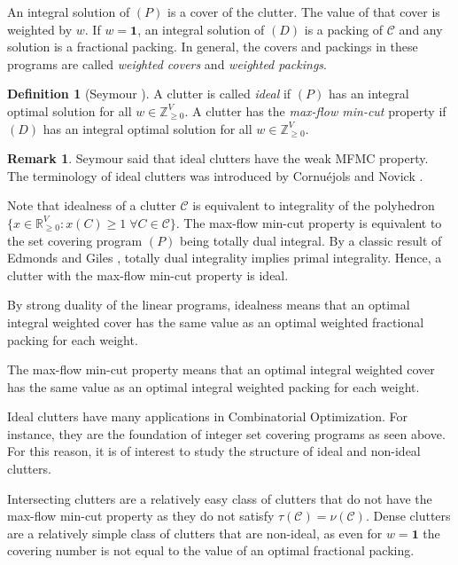 \documentclass[a4paper, 12pt]{scrbook}
\theoremstyle{definition}
\newtheorem*{definition}{Definition}
\newtheorem*{remark}{Remark}
\newcommand*{\IR}{\ensuremath{\mathbb{R}}}
\newcommand*{\IZ}{\ensuremath{\mathbb{Z}}}
\begin{document}
   \vspace{1cm}
   An integral solution of $(P)$ is a cover of the clutter. The value of that cover is weighted by $w$. If $w=\textbf{1}$, an integral solution of $(D)$ is a packing of $\mathcal{C}$ and any solution is a fractional packing.
   In general, the covers and packings in these programs are called \emph{weighted covers} and \emph{weighted packings}.

   \begin{definition}[Seymour \cite{q6}]
       A clutter is called \emph{ideal} if $(P)$ has an integral optimal solution for all $w \in \IZ^V_{\geq 0}$. A clutter has the \emph{max-flow min-cut} property if $(D)$ has an integral optimal solution for all $w \in \IZ^V_{\geq 0}$.
   \end{definition}
   \begin{remark}
       Seymour \cite{q6} said that ideal clutters have the weak MFMC property. The terminology of ideal clutters was introduced by Cornuéjols and Novick \cite{idealdef}.
   \end{remark}

   Note that idealness of a clutter $\mathcal{C}$ is equivalent to integrality of the polyhedron $\{x \in \IR^V_{\geq 0}: x(C) \geq 1 \; \forall C \in \mathcal{C}\}$.
   The max-flow min-cut property is equivalent to the set covering program $(P)$ being totally dual integral.
   By a classic result of Edmonds and Giles \cite{tdi}, totally dual integrality implies primal integrality.
   Hence, a clutter with the max-flow min-cut property is ideal.

   By strong duality of the linear programs, idealness means that an optimal integral weighted cover has the same value as an optimal weighted fractional packing for each weight.

   The max-flow min-cut property means that an optimal integral weighted cover has the same value as an optimal integral weighted packing for each weight.

   Ideal clutters have many applications in Combinatorial Optimization. For instance, they are the foundation of integer set covering programs as seen above. For this reason, it is of interest to study the structure of ideal and non-ideal clutters.

   Intersecting clutters are a relatively easy class of clutters that do not have the max-flow min-cut property as they do not satisfy $\tau(\mathcal{C})=\nu(\mathcal{C})$. Dense clutters are a relatively simple class of clutters that are non-ideal, as even for $w=\textbf{1}$ the covering number is not equal to the value of an optimal fractional packing.
\end{document}
